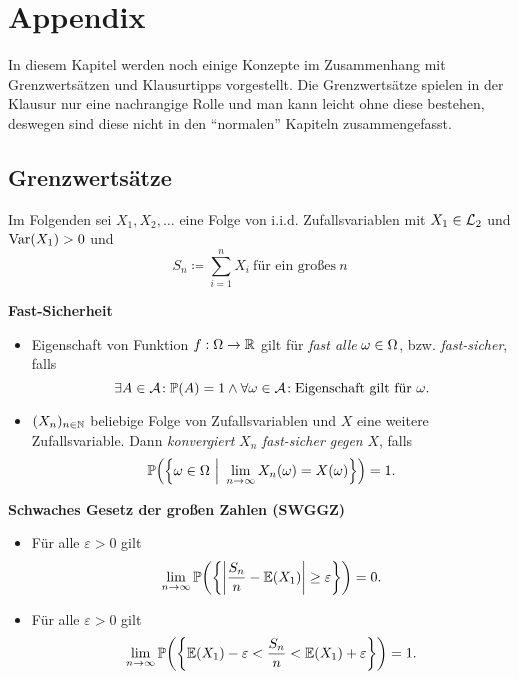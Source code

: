 \section{Appendix}

In diesem Kapitel werden noch einige Konzepte im Zusammenhang mit Grenzwertsätzen und Klausurtipps vorgestellt. Die Grenzwertsätze spielen in der Klausur nur eine nachrangige Rolle und man kann leicht ohne diese bestehen, deswegen sind diese nicht in den ``normalen'' Kapiteln zusammengefasst.

\subsection{Grenzwertsätze}

Im Folgenden sei $X_1,X_2,\ldots$ eine Folge von i.i.d. Zufallsvariablen mit $X_1\in\mathcal{L}_2$ und $\operatorname{Var}(X_1)>0$ und
\[
  S_n\coloneqq \sum_{i=1}^n X_i\ \text{für ein großes}\ n
\]

\textbf{Fast-Sicherheit}
\begin{itemize}
	\item Eigenschaft von Funktion $f:\Omega\rightarrow\mathbb{R}$ gilt für \emph{fast alle} $\omega\in\Omega$, bzw. \emph{fast-sicher}, falls
	\[
	  \exists A\in\A\!:\Pr(A)=1\wedge\forall\o\in\A\!:\text{Eigenschaft gilt für}\ \o.
	\]
	
	\item $(X_n)_{n\in\mathbb{N}}$ beliebige Folge von Zufallsvariablen und $X$ eine weitere Zufallsvariable. Dann \emph{konvergiert} $X_n$ \emph{fast-sicher gegen} $X$, falls
	\[
	  \Pr\left(\left\{\o\in\O\ \Big\vert\ \limfty{n} X_n(\o)=X(\o)\right\}\right)=1.
	\]
\end{itemize}

\textbf{Schwaches Gesetz der großen Zahlen (SWGGZ)}
\begin{itemize}
	\item Für alle $\varepsilon>0$ gilt
	\[
	  \limfty{n} \Pr\left(\left\{\left\lvert\frac{S_n}{n}-\E(X_1)\right\rvert\geq\varepsilon\right\}\right)=0.
	\]

	\item Für alle $\varepsilon>0$ gilt
	\[
	\limfty{n} \Pr\left(\left\{\E(X_1)-\varepsilon<\frac{S_n}{n}<\E(X_1)+\varepsilon\right\}\right)=1.
	\]
\end{itemize}

